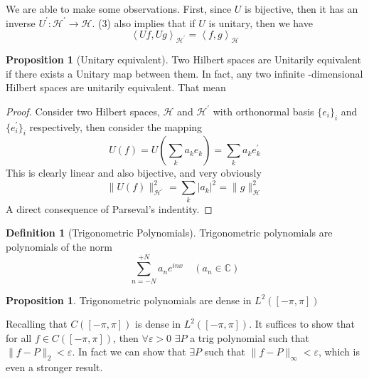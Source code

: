 \documentclass[13pt]{article}
\newcommand{\inprod}[1]{\left\langle #1 \right\rangle}
\theoremstyle{definition} --- default
\newtheorem{proposition}[theorem]{Proposition}
\theoremstyle{definition}
\newtheorem{definition}[theorem]{Definition}
\theoremstyle{remark}
\begin{document}
We are able to make some observations. First, since $U$ is bijective, then it has an inverse $U^\prime \colon \mathcal{H}^\prime \to \mathcal{H}$. (3) also implies that if $U$ is unitary, then we have 
$$
	\inprod{Uf, Ug}_{\mathcal{H}^\prime} = \inprod{f,g}_{\mathcal{H}}
$$
\begin{proposition}[Unitary equivalent]
	Two Hilbert spaces are Unitarily equivalent if there exists a Unitary map between them. In fact, any two infinite -dimensional Hilbert spaces are unitarily equivalent. That mean
\end{proposition}
\begin{proof}
	Consider two Hilbert spaces, $\mathcal{H}$ and $\mathcal{H}^\prime$ with orthonormal basis $\{e_i\}_i$ and $\{e_i^\prime\}_i$ respectively, then consider the mapping 
	$$
		U(f) = U( \sum_{k} a_k e_k) = \sum_{k} a_k e_k^\prime
	$$
	This is clearly linear and also bijective, and very obviously
	$$
	\|U(f)\|_{\mathcal{H}^\prime}^2 = \sum_{k} |a_k|^2 = \|g\|^2_{\mathcal{H}}
	$$
	A direct consequence of Parseval's indentity.
\end{proof}


\begin{definition}[Trigonometric Polynomials]
    Trigonometric polynomials are polynomials of the norm 
    $$  \sum_{n=-N}^{+N} a_n e^{inx} \quad (a_n \in \mathbb{C})$$

    
\end{definition}
\begin{proposition}
    Trigonometric polynomials are dense in $L^2([-\pi,\pi])$
    
\end{proposition}
Recalling that $C([-\pi,\pi])$ is dense in $L^2([-\pi,\pi])$. It suffices to show that for all $f \in C([-\pi,\pi])$, then $\forall \varepsilon >0$ $\exists P$ a trig polynomial such that $\|f - P\|_2 < \varepsilon$. In fact we can show that $\exists P$ such that $\|f - P\|_{\infty} < \varepsilon$, which is even a stronger result. 
\end{document}
